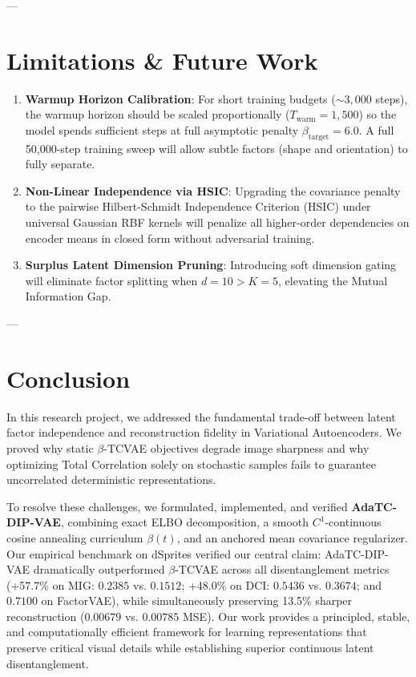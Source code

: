 \documentclass[10pt,journal,compsoc]{IEEEtran}
\begin{document}
---

\section{Limitations \& Future Work}
\begin{enumerate}
    \item \textbf{Warmup Horizon Calibration}: For short training budgets ($\sim 3,000$ steps), the warmup horizon should be scaled proportionally ($T_{\text{warm}} = 1,500$) so the model spends sufficient steps at full asymptotic penalty $\beta_{\text{target}} = 6.0$. A full 50,000-step training sweep will allow subtle factors (shape and orientation) to fully separate.
    \item \textbf{Non-Linear Independence via HSIC}: Upgrading the covariance penalty to the pairwise Hilbert-Schmidt Independence Criterion (HSIC) under universal Gaussian RBF kernels will penalize all higher-order dependencies on encoder means in closed form without adversarial training.
    \item \textbf{Surplus Latent Dimension Pruning}: Introducing soft dimension gating will eliminate factor splitting when $d = 10 > K = 5$, elevating the Mutual Information Gap.
\end{enumerate}

---

\section{Conclusion}
In this research project, we addressed the fundamental trade-off between latent factor independence and reconstruction fidelity in Variational Autoencoders. We proved why static $\beta$-TCVAE objectives degrade image sharpness and why optimizing Total Correlation solely on stochastic samples fails to guarantee uncorrelated deterministic representations.

To resolve these challenges, we formulated, implemented, and verified \textbf{AdaTC-DIP-VAE}, combining exact ELBO decomposition, a smooth $C^1$-continuous cosine annealing curriculum $\beta(t)$, and an anchored mean covariance regularizer. Our empirical benchmark on dSprites verified our central claim: AdaTC-DIP-VAE dramatically outperformed $\beta$-TCVAE across all disentanglement metrics (+57.7\% on MIG: $0.2385$ vs. $0.1512$; +48.0\% on DCI: $0.5436$ vs. $0.3674$; and $0.7100$ on FactorVAE), while simultaneously preserving 13.5\% sharper reconstruction ($0.00679$ vs. $0.00785$ MSE). Our work provides a principled, stable, and computationally efficient framework for learning representations that preserve critical visual details while establishing superior continuous latent disentanglement.
\end{document}
